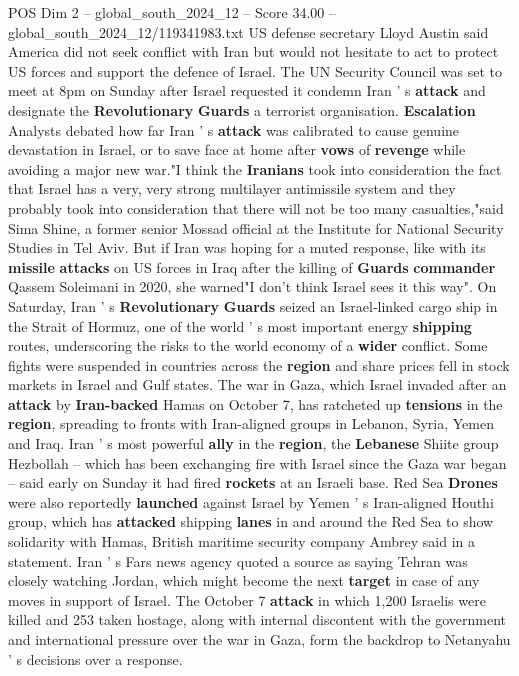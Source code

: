 \begin{textsample}{POS Dim 2 – global\_south\_2024\_12 – Score 34.00 – global\_south\_2024\_12/119341983.txt}
US defense secretary Lloyd Austin said America did not seek conflict with Iran but would not hesitate to act to protect US forces and support the defence of Israel.
The UN Security Council was set to meet at 8pm on Sunday after Israel requested it condemn Iran ' s \textbf{attack} and designate the \textbf{Revolutionary} \textbf{Guards} a terrorist organisation. \textbf{Escalation} Analysts debated how far Iran ' s \textbf{attack} was calibrated to cause genuine devastation in Israel, or to save face at home after \textbf{vows} of \textbf{revenge} while avoiding a major new war."I think the \textbf{Iranians} took into consideration the fact that Israel has a very, very strong multilayer antimissile system and they probably took into consideration that there will not be too many casualties,"said Sima Shine, a former senior Mossad official at the Institute for National Security Studies in Tel Aviv.
But if Iran was hoping for a muted response, like with its \textbf{missile} \textbf{attacks} on US forces in Iraq after the killing of \textbf{Guards} \textbf{commander} Qassem Soleimani in 2020, she warned"I don't think Israel sees it this way".
On Saturday, Iran ' s \textbf{Revolutionary} \textbf{Guards} seized an Israel-linked cargo ship in the Strait of Hormuz, one of the world ' s most important energy \textbf{shipping} routes, underscoring the risks to the world economy of a \textbf{wider} conflict.
Some fights were suspended in countries across the \textbf{region} and share prices fell in stock markets in Israel and Gulf states.
The war in Gaza, which Israel invaded after an \textbf{attack} by \textbf{Iran-backed} Hamas on October 7, has ratcheted up \textbf{tensions} in the \textbf{region}, spreading to fronts with Iran-aligned groups in Lebanon, Syria, Yemen and Iraq.
Iran ' s most powerful \textbf{ally} in the \textbf{region}, the \textbf{Lebanese} Shiite group Hezbollah -- which has been exchanging fire with Israel since the Gaza war began -- said early on Sunday it had fired \textbf{rockets} at an Israeli base.
Red Sea \textbf{Drones} were also reportedly \textbf{launched} against Israel by Yemen ' s Iran-aligned Houthi group, which has \textbf{attacked} shipping \textbf{lanes} in and around the Red Sea to show solidarity with Hamas, British maritime security company Ambrey said in a statement.
Iran ' s Fars news agency quoted a source as saying Tehran was closely watching Jordan, which might become the next \textbf{target} in case of any moves in support of Israel.
The October 7 \textbf{attack} in which 1,200 Israelis were killed and 253 taken hostage, along with internal discontent with the government and international pressure over the war in Gaza, form the backdrop to Netanyahu ' s decisions over a response.

\end{textsample}
